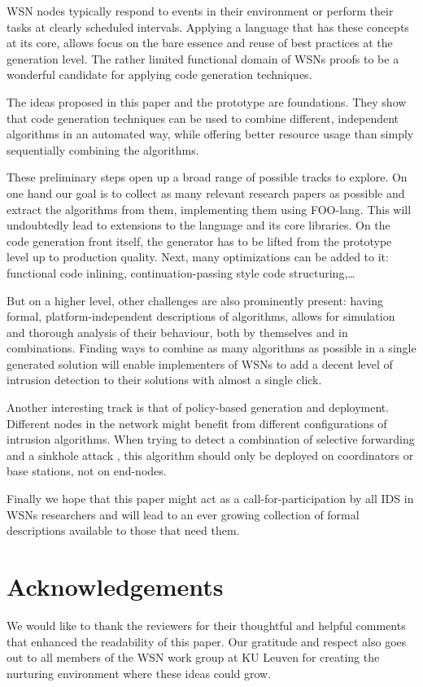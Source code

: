 \documentclass[conference]{IEEEtran}
\begin{document}
WSN nodes typically respond to events in their environment or perform their
tasks at clearly scheduled intervals. Applying a language that has these
concepts at its core, allows focus on the bare essence and reuse of best
practices at the generation level. The rather limited functional domain of WSNs
proofs to be a wonderful candidate for applying code generation techniques.

The ideas proposed in this paper and the prototype are foundations. They show
that code generation techniques can be used to combine different, independent
algorithms in an automated way, while offering better resource usage than
simply sequentially combining the algorithms.

These preliminary steps open up a broad range of possible tracks to explore. On
one hand our goal is to collect as many relevant research papers as possible
and extract the algorithms from them, implementing them using FOO-lang. This
will undoubtedly lead to extensions to the language and its core libraries. On
the code generation front itself, the generator has to be lifted from the
prototype level up to production quality. Next, many optimizations can be added
to it: functional code inlining, continuation-passing style code
structuring,\dots

But on a higher level, other challenges are also prominently present: having
formal, platform-independent descriptions of algorithms, allows for simulation
and thorough analysis of their behaviour, both by themselves and in
combinations. Finding ways to combine as many algorithms as possible in a
single generated solution will enable implementers of WSNs to add a decent
level of intrusion detection to their solutions with almost a single click.

Another interesting track is that of policy-based generation and deployment.
Different nodes in the network might benefit from different configurations of
intrusion algorithms. When trying to detect a combination of selective
forwarding and a sinkhole attack \cite{ngai2006intruder}, this algorithm should
only be deployed on coordinators or base stations, not on end-nodes.

Finally we hope that this paper might act as a call-for-participation by all
IDS in WSNs researchers and will lead to an ever growing collection of formal
descriptions available to those that need them.

\section*{Acknowledgements}
\label{section:acknowledgements}

We would like to thank the reviewers for their thoughtful and helpful comments
that enhanced the readability of this paper. Our gratitude and respect also
goes out to all members of the WSN work group at KU Leuven for creating the
nurturing environment where these ideas could grow.



\end{document}
